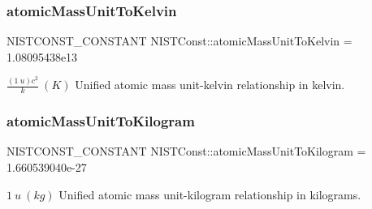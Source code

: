\subsubsection{\texorpdfstring{atomic\+Mass\+Unit\+To\+Kelvin}{atomicMassUnitToKelvin}}
{\footnotesize\ttfamily N\+I\+S\+T\+C\+O\+N\+S\+T\+\_\+\+C\+O\+N\+S\+T\+A\+NT N\+I\+S\+T\+Const\+::atomic\+Mass\+Unit\+To\+Kelvin = 1.\+08095438e13}

$\frac{(1\ u)c^2}{k} \ (K)$ Unified atomic mass unit-\/kelvin relationship in kelvin. \mbox{\label{group___n_i_s_t_const-_atomic_mass_unit_ga72ba2b08855b26ea2477c3e8104bbc16}} 
\subsubsection{\texorpdfstring{atomic\+Mass\+Unit\+To\+Kilogram}{atomicMassUnitToKilogram}}
{\footnotesize\ttfamily N\+I\+S\+T\+C\+O\+N\+S\+T\+\_\+\+C\+O\+N\+S\+T\+A\+NT N\+I\+S\+T\+Const\+::atomic\+Mass\+Unit\+To\+Kilogram = 1.\+660539040e-\/27}

$1\ u\ (kg)$ Unified atomic mass unit-\/kilogram relationship in kilograms. 
